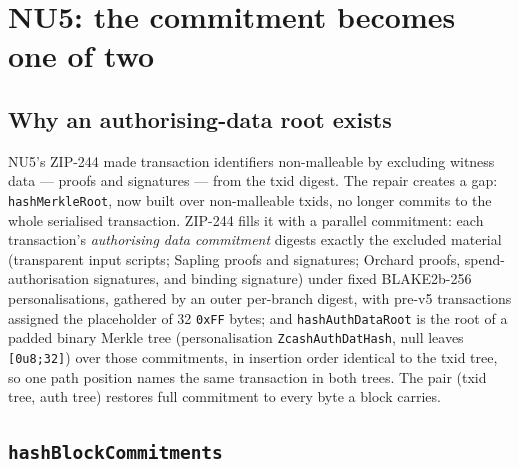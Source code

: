\documentclass[11pt,a4paper]{article}
\theoremstyle{definition}
\begin{document}
\section{NU5: the commitment becomes one of two}\label{sec:fc-nu5}

\subsection{Why an authorising-data root exists}\label{sec:fc-authdata}

NU5's ZIP-244 made transaction identifiers non-malleable by excluding
witness data --- proofs and signatures --- from the txid digest. The
repair creates a gap: \texttt{hashMerkleRoot}, now built over
non-malleable txids, no longer commits to the whole serialised
transaction. ZIP-244 fills it with a parallel commitment: each
transaction's \emph{authorising data commitment} digests exactly the
excluded material (transparent input scripts; Sapling proofs and
signatures; Orchard proofs, spend-authorisation signatures, and binding
signature) under fixed BLAKE2b-256 personalisations, gathered by an outer
per-branch digest, with pre-v5 transactions assigned the placeholder of 32
\texttt{0xFF} bytes; and
\texttt{hashAuthDataRoot} is the root of a padded binary Merkle tree
(personalisation \texttt{ZcashAuthDatHash}, null leaves
\texttt{[0u8;32]}) over those commitments, in insertion order identical
to the txid tree, so one path position names the same transaction in
both trees. The pair (txid tree, auth tree) restores full commitment to
every byte a block carries.

\subsection{\texttt{hashBlockCommitments}}\label{sec:fc-blockcommitments}
\end{document}
